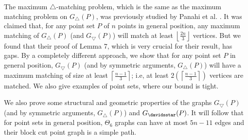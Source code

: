 The maximum $\bigtriangleup$-matching problem, which is the same as the maximum matching problem on $G_\bigtriangleup(P)$, was previously studied by 
Panahi et al. \cite{Panahi}. It was claimed that, for any point set $P$ of $n$ points in general position, any maximum matching of $G_\bigtriangleup(P)$ 
(and $G_{\bigtriangledown}(P)$) will match at least $\left \lfloor \frac{2n}{3} \right \rfloor$ vertices. But we found that their proof of Lemma 7, 
which is very crucial for their result, has gaps. By a completely different approach, we show that for any point set $P$ in general position, 
$G_\bigtriangledown(P)$ (and by symmetric arguments, $G_{\bigtriangleup}(P)$) will have a maximum matching of size at least 
$\left \lceil\frac{n-1}{3} \right \rceil$; i.e, at least $2\left(\left\lceil\frac{n-1}{3}\right \rceil\right)$ vertices are matched. 
We also give examples of point sets, where our bound is tight.

We also prove some structural and geometric properties of the graphs $G_{\bigtriangledown}(P)$ (and by symmetric arguments, $G_{\bigtriangleup}(P)$) 
and $G_{\davidsstar}(P)$. It will follow that for point sets in general position, $\Theta_6$ graphs can have at most $5n-11$ edges and their block cut 
point graph is a simple path. 

